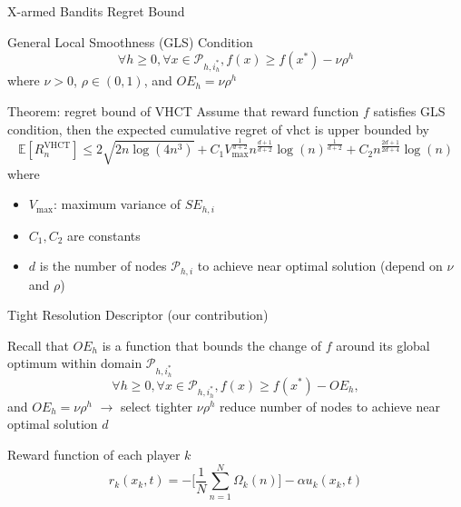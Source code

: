 \documentclass[9pt]{beamer}
\begin{document}
\begin{frame}{X-armed Bandits Regret Bound}
    \begin{block}{General Local Smoothness (GLS) Condition}
        \begin{equation}
            \forall h \ge 0, \forall x \in \mathcal{P}_{h, i^*_h}, f(x) \ge f(x^*) - \nu \rho^h
        \end{equation}
        where $\nu > 0$, $\rho \in (0, 1)$, and $OE_h = \nu \rho^h$
    \end{block}
    \begin{block}{Theorem: regret bound of VHCT}
        Assume that reward function $f$ satisfies GLS condition, then the expected cumulative regret of \gls{vhct} is upper bounded by
        \begin{equation}
            \mathbb{E}[R_n^{\text{VHCT}}] \le 2 \sqrt{2n\log(4n^3)} +
                                              C_1 V_{\text{max}} ^ {\frac{1}{d + 2}} n^{\frac{d+1}{d+2}} \log(n)^{\frac{1}{d+2}} +
                                              C_2 n^{\frac{2d+1}{2d+4}} \log(n)
        \end{equation}
        where
        \begin{itemize}
            \item $V_{\text{max}}$: maximum variance of $SE_{h, i}$
            \item $C_1, C_2$ are constants
            \item $d$ is the number of nodes $\mathcal{P}_{h, i}$ to achieve near optimal solution (depend on $\nu$ and $\rho$)
        \end{itemize}
    \end{block}
\end{frame}

\begin{frame}{Tight Resolution Descriptor (our contribution)}
    \begin{block}{Recall that}
        $OE_h$ is a function that bounds the change of $f$ around its global optimum within domain $\mathcal{P}_{h, i^*_h}$
            \begin{equation}
                \forall h \ge 0, \forall x \in \mathcal{P}_{h, i^*_h}, f(x) \ge f(x^*) - OE_h,
            \end{equation}
        and $OE_h = \nu \rho^h$
        $\rightarrow$ select tighter $\nu \rho^h$ reduce number of nodes to achieve near optimal solution $d$
    \end{block}
    \begin{block}{Reward function of each player $k$}
        \begin{equation}
            r_k(x_k, t) = - \Big[ \frac{1}{N} \sum_{n=1}^{N} \Omega_k(n) \Big] - \alpha u_k(x_k, t)
        \end{equation}
    \end{block}
\end{frame}
\end{document}
